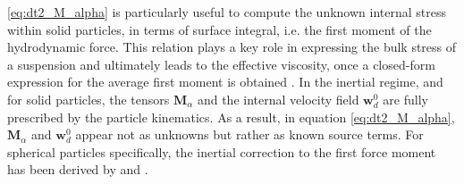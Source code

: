\ref{eq:dt2_M_alpha} is particularly useful to compute the unknown internal stress within solid particles, in terms of surface integral, i.e. the first moment of the hydrodynamic force.
This relation plays a key role in expressing the bulk stress of a suspension and ultimately leads to the effective viscosity, once a closed-form expression for the average first moment is obtained \citep{batchelor1970stress}. 
In the inertial regime, and for solid particles, the tensors $\textbf{M}_\alpha$ and the internal velocity field $\textbf{w}_d^0$ are fully prescribed by the particle kinematics. 
As a result, in equation \ref{eq:dt2_M_alpha}, $\textbf{M}_\alpha$ and $\textbf{w}_d^0$ appear not as unknowns but rather as known source terms.
For spherical particles specifically, the inertial correction to the first force moment has been derived by \citet{hwang1989modeling} and  \citet{lhuillier1996contribution}.






